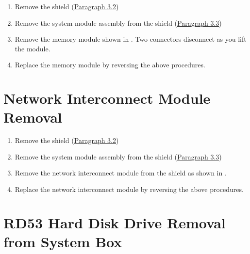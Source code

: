 \begin{enumerate}

\item	Remove the shield (\hyperlink{section.3.2}{Paragraph 3.2})

\item	Remove the system module assembly from the shield (\hyperlink{section.3.3}{Paragraph 3.3})

\item	Remove the memory module shown in . Two connectors
		disconnect as you lift the module.


\item	Replace the memory module by reversing the above procedures.

\end{enumerate}
\newpage

\section{Network Interconnect Module Removal}
\begin{enumerate}

\item	Remove the shield (\hyperlink{section.3.2}{Paragraph 3.2})

\item 	Remove the system module assembly from the shield (\hyperlink{section.3.3}{Paragraph 3.3})

\item	Remove the network interconnect module from the shield as shown in .


\item	Replace the network interconnect module by reversing the above procedures.
\end{enumerate}

\newpage

\section{RD53 Hard Disk Drive Removal from System Box}

